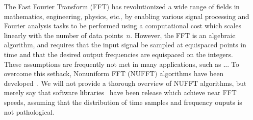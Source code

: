 
The Fast Fourier Transform (FFT) has revolutionized a wide range of fields in
mathematics, engineering, physics, etc., by enabling various signal processing
and Fourier analysis tasks to be performed using a computational cost which
scales linearly with the number of data points~$n$. However, the FFT is an
algebraic algorithm, and requires that the input signal be sampled at equispaced
points in time and that the desired output frequencies are equispaced on the
integers. These assumptions are frequently not met in many applications, such as
... To overcome this setback, Nonuniform FFT (NUFFT) algorithms have been
developed~\cite{}. We will not provide a thorough overview of NUFFT algorithms,
but merely say that software libraries~\cite{} have been release which achieve
near FFT speeds, assuming that the distribution of time samples and frequency
ouputs is not pathological.

